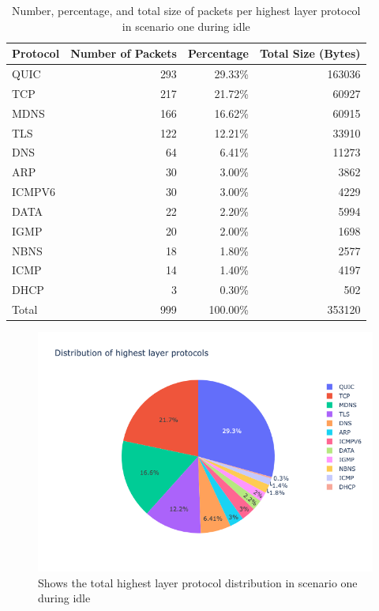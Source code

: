 \documentclass[sigconf,nonacm]{acmart}
\begin{document}
\begin{table}[ht]
\centering
\caption{Number, percentage, and total size of packets per highest layer protocol in scenario one during idle}
\begin{tabular}{lrrr}
\toprule
Protocol & Number of Packets & Percentage & Total Size (Bytes) \\
\midrule
QUIC & 293 & 29.33\% & 163036 \\
TCP & 217 & 21.72\% & 60927 \\
MDNS & 166 & 16.62\% & 60915 \\
TLS & 122 & 12.21\% & 33910 \\
DNS & 64 & 6.41\% & 11273 \\
ARP & 30 & 3.00\% & 3862 \\
ICMPV6 & 30 & 3.00\% & 4229 \\
DATA & 22 & 2.20\% & 5994 \\
IGMP & 20 & 2.00\% & 1698 \\
NBNS & 18 & 1.80\% & 2577 \\
ICMP & 14 & 1.40\% & 4197 \\
DHCP & 3 & 0.30\% & 502 \\
\midrule
Total & 999 & 100.00\% & 353120 \\
\bottomrule
\end{tabular}
\label{tab:packets_per_protocol_idle}
\end{table}
\begin{figure}[htbp]
    \centering
    \includegraphics[width=\columnwidth]{images/distributionofhighestlayerprotocols.png}
    \caption{Shows the total highest layer protocol distribution in scenario one during idle}
    \label{fig:protocol_distribution_total_idle}
\end{figure}
\end{document}

